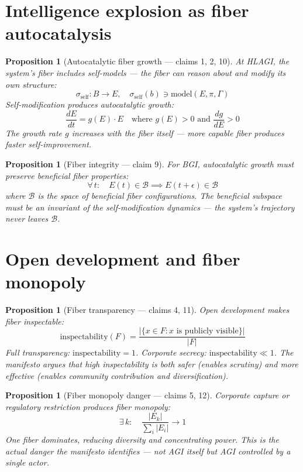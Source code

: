 \documentclass[11pt,a4paper]{article}
\newtheorem{proposition}[definition]{Proposition}
\begin{document}
\section{Intelligence explosion as fiber autocatalysis}

\begin{proposition}[Autocatalytic fiber growth --- claims 1, 2, 10]
\label{prop:autocatalysis}
At HLAGI, the system's fiber includes self-models --- the fiber can
reason about and modify its own structure:
\[
  \sigma_{\text{self}}: B \to E, \quad
  \sigma_{\text{self}}(b) \ni \text{model}(E, \pi, \Gamma)
\]
Self-modification produces autocatalytic growth:
\[
  \frac{dE}{dt} = g(E) \cdot E \quad \text{where } g(E) > 0 \text{ and }
    \frac{dg}{dE} > 0
\]
The growth rate $g$ increases with the fiber itself --- more capable
fiber produces faster self-improvement.
\end{proposition}

\begin{proposition}[Fiber integrity --- claim 9]
\label{prop:integrity}
For BGI, autocatalytic growth must preserve beneficial fiber properties:
\[
  \forall\, t: \quad E(t) \in \mathcal{B} \implies E(t + \epsilon) \in \mathcal{B}
\]
where $\mathcal{B}$ is the space of beneficial fiber configurations.
The beneficial subspace must be an \emph{invariant} of the self-modification
dynamics --- the system's trajectory never leaves $\mathcal{B}$.
\end{proposition}

\section{Open development and fiber monopoly}

\begin{proposition}[Fiber transparency --- claims 4, 11]
\label{prop:transparent}
Open development makes fiber inspectable:
\[
  \text{inspectability}(F) = \frac{|\{x \in F : x \text{ is publicly visible}\}|}{|F|}
\]
Full transparency: $\text{inspectability} = 1$. Corporate secrecy:
$\text{inspectability} \ll 1$. The manifesto argues that high
inspectability is both safer (enables scrutiny) and more effective
(enables community contribution and diversification).
\end{proposition}

\begin{proposition}[Fiber monopoly danger --- claims 5, 12]
\label{prop:monopoly}
Corporate capture or regulatory restriction produces fiber monopoly:
\[
  \exists\, k: \quad \frac{|E_k|}{\sum_i |E_i|} \to 1
\]
One fiber dominates, reducing diversity and concentrating power. This
is the actual danger the manifesto identifies --- not AGI itself but
AGI controlled by a single actor.
\end{proposition}
\end{document}
